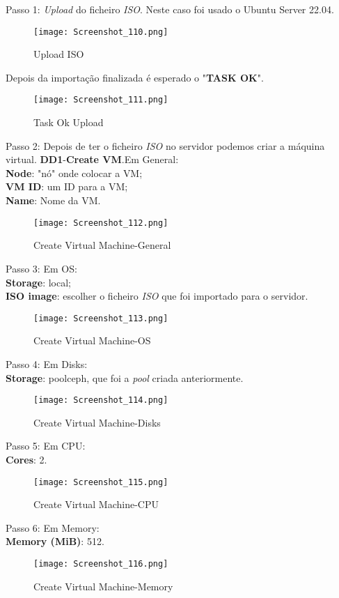 Passo 1: \textit{Upload} do ficheiro \textit{ISO}. Neste caso foi usado o Ubuntu Server 22.04.
\begin{figure}[H]
\center
\texttt{[image: Screenshot\_110.png]}
\caption{Upload ISO}
\end{figure}

Depois da importação finalizada é esperado o "\textbf{TASK OK}".
\begin{figure}[H]
\center
\texttt{[image: Screenshot\_111.png]}
\caption{Task Ok Upload}
\end{figure}

\newpage
Passo 2: Depois de ter o ficheiro \textit{ISO} no servidor podemos criar a máquina virtual. \textbf{DD1}-\textbf{Create VM}.Em General:\\
\textbf{Node}: "nó" onde colocar a \ac{VM};\\
\textbf{VM ID}: um ID para a \ac{VM};\\
\textbf{Name}: Nome da \ac{VM}.
\begin{figure}[H]
\center
\texttt{[image: Screenshot\_112.png]}
\caption{Create Virtual Machine-General}
\end{figure}

Passo 3: Em OS:\\
\textbf{Storage}: local;\\
\textbf{ISO image}: escolher o ficheiro \textit{ISO} que foi importado para o servidor.\\
\begin{figure}[H]
\center
\texttt{[image: Screenshot\_113.png]}
\caption{Create Virtual Machine-OS}
\end{figure}

\newpage
Passo 4: Em Disks:\\
\textbf{Storage}: poolceph, que foi a \textit{pool} criada anteriormente.
\begin{figure}[H]
\center
\texttt{[image: Screenshot\_114.png]}
\caption{Create Virtual Machine-Disks}
\end{figure}

Passo 5: Em CPU:\\
\textbf{Cores}: 2.
\begin{figure}[H]
\center
\texttt{[image: Screenshot\_115.png]}
\caption{Create Virtual Machine-CPU}
\end{figure}

\newpage
Passo 6: Em Memory:\\
\textbf{Memory (MiB)}: 512.
\begin{figure}[H]
\center
\texttt{[image: Screenshot\_116.png]}
\caption{Create Virtual Machine-Memory}
\end{figure}

